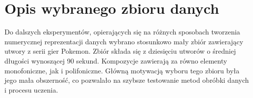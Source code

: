 {    \section{Opis wybranego zbioru danych}
    {
        Do dalszych eksperymentów, opierających się na różnych sposobach tworzenia numerycznej reprezentacji
        danych wybrano stosunkowo mały zbiór zawierający utwory z serii gier Pokemon.
        Zbiór składa się z dziesięciu utworów o średniej długości wynoszącej 90 sekund. Kompozycje zawierają za równo 
        elementy monofoniczne, jak i polifoniczne. Główną motywacją wyboru tego zbioru była jego mała obszerność,
        co pozwalało na szybsze testowanie metod obróbki danych i procesu uczenia.
    }
}